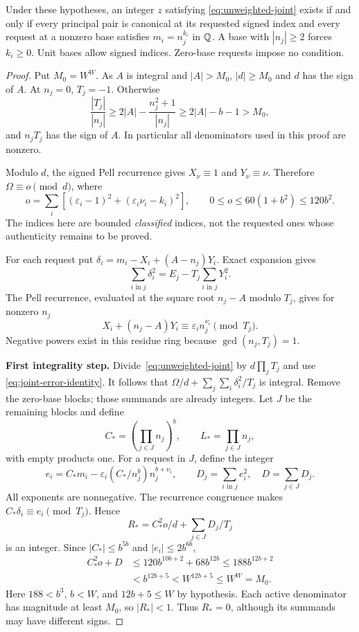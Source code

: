 \begin{theorem}\label{thm:unweighted-joint}
Under these hypotheses, an integer $z$ satisfying
\eqref{eq:unweighted-joint} exists if and only if every principal pair is
canonical at its requested signed index and every request at a nonzero
base satisfies $m_i=n_j^{k_i}$ in $\mathbb Q$. A base with $|n_j|\ge2$ forces $k_i\ge0$.
Unit bases allow signed indices. Zero-base requests impose no condition.
\end{theorem}
\begin{proof}
Put $M_0=W^W$. As $A$ is integral and $|A|>M_0$, $|d|\ge M_0$ and
$d$ has the sign of $A$. At $n_j=0$, $T_j=-1$. Otherwise
\[
 \frac{|T_j|}{|n_j|}
 \ge2|A|-\frac{n_j^2+1}{|n_j|}
 \ge2|A|-b-1>M_0,
\]
and $n_jT_j$ has the sign of $A$. In particular all denominators used
in this proof are nonzero.

Modulo $d$, the signed Pell recurrence gives $X_\nu\equiv1$ and
$Y_\nu\equiv\nu$. Therefore $\Omega\equiv o\pmod d$, where
\[
 o=\sum_i[(\varepsilon_i-1)^2+(\varepsilon_i\nu_i-k_i)^2],
 \qquad0\le o\le60(1+b^2)\le120b^2.
\]
The indices here are bounded \emph{classified} indices, not the requested
ones whose authenticity remains to be proved.

For each request put $\delta_i=m_i-X_i+(A-n_j)Y_i$. Exact expansion gives
\begin{equation}\label{eq:joint-error-identity}
 \sum_{i\text{ in }j}\delta_i^2=E_j-T_j\sum_{i\text{ in }j}Y_i^2.
\end{equation}
The Pell recurrence, evaluated at the square root $n_j-A$ modulo $T_j$,
gives for nonzero $n_j$
\[
 X_i+(n_j-A)Y_i\equiv\varepsilon_i n_j^{\nu_i}\pmod{T_j}.
\]
Negative powers exist in this residue ring because $\gcd(n_j,T_j)=1$.

\textbf{First integrality step.}
Divide~\eqref{eq:unweighted-joint} by $d\prod_jT_j$ and use
\eqref{eq:joint-error-identity}. It follows that
$\Omega/d+\sum_j\sum_i\delta_i^2/T_j$ is integral.
Remove the zero-base blocks; those summands are already integers.
Let $J$ be the remaining blocks and define
\[
 C_*=(\prod_{j\in J}n_j)^b,
 \qquad L_*=\prod_{j\in J}n_j,
\]
with empty products one. For a request in $J$, define the integer
\[
 e_i=C_*m_i-\varepsilon_i(C_*/n_j^b)n_j^{b+\nu_i},
 \qquad D_j=\sum_{i\text{ in }j}e_i^2,\quad D=\sum_{j\in J}D_j.
\]
All exponents are nonnegative. The recurrence congruence makes
$C_*\delta_i\equiv e_i\pmod{T_j}$. Hence
\[
 R_*=C_*^2o/d+\sum_{j\in J}D_j/T_j
\]
is an integer. Since $|C_*|\le b^{5b}$ and $|e_i|\le2b^{6b}$,
\begin{align*}
 C_*^2o+D
 &\le120b^{10b+2}+68b^{12b}\le188b^{12b+2}\\
 &<b^{12b+5}<W^{12b+5}\le W^W=M_0.
\end{align*}
Here $188<b^3$, $b<W$, and $12b+5\le W$ by hypothesis.
Each active denominator has magnitude at least $M_0$, so $|R_*|<1$.
Thus $R_*=0$, although its summands may have different signs.


\end{proof}

